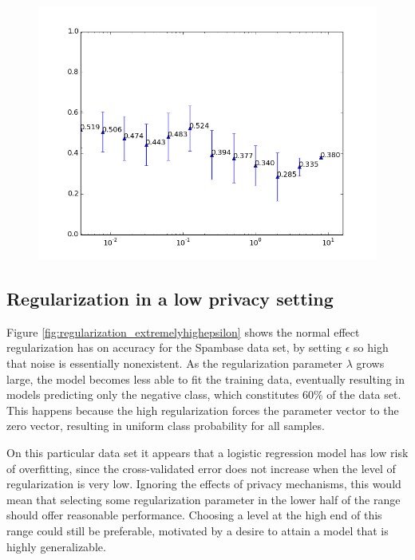 \begin{figure}[h!]
\begin{minipage}{.49\linewidth}
		\label{fig:regularization_normalepsilon}
	\end{minipage}
	\begin{minipage}{.49\linewidth}
		\includegraphics[width=\linewidth]{fig/spambase/eps0.01,budg=eps,peers10,groups10,reg2e-8-2e3-data368-pubAll-spam-baseline-testsetmean}
		\label{fig:regularization_lowepsilon}
	\end{minipage}
\end{figure}

\subsection{Regularization in a low privacy setting}
Figure \ref{fig:regularization_extremelyhighepsilon} shows the normal effect regularization has on accuracy for the Spambase data set, by setting $\epsilon$ so high that noise is essentially nonexistent. As the regularization parameter $\lambda$ grows large, the model becomes less able to fit the training data, eventually resulting in models predicting only the negative class, which constitutes 60\% of the data set. This happens because the high regularization forces the parameter vector to the zero vector, resulting in uniform class probability for all samples. 

On this particular data set it appears that a logistic regression model has low risk of overfitting, since the cross-validated error does not increase when the level of regularization is very low. Ignoring the effects of privacy mechanisms, this would mean that selecting some regularization parameter in the lower half of the range should offer reasonable performance. Choosing a level at the high end of this range could still be preferable, motivated by a desire to attain a model that is highly generalizable.

